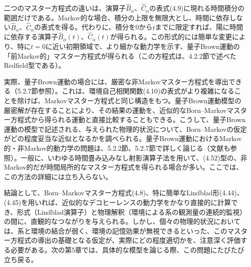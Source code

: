 \hypertarget{srcpage:170}{}\label{srcpage:170}
二つのマスター方程式の違いは、演算子$\hat B_\alpha$、$\hat C_\alpha$の表式(4.9)に現れる時間積分の範囲だけである。Markov的な場合、積分の上限を無限大とし、時間に依存しない$\hat B_\alpha$、$\hat C_\alpha$の表式を得る。代わりに、積分を0から$t$までに限定すれば、陽に時間に依存する演算子$\hat B_\alpha(t)$、$\hat C_\alpha(t)$が得られる。この形式的には簡単な変更により、特に$t=0$に近い初期領域で、より細かな動力学を示す、量子Brown運動の「前Markov的」マスター方程式が得られる（この方程式は、4.2.2節で述べたRedfield型である）。

実際、量子Brown運動の場合には、厳密な非Markovマスター方程式を導出できる（5.2.7節参照）。これは、環境自己相関関数(4.10)の表式がより複雑になることを除けば、Markovマスター方程式と同じ構造をもつ。量子Brown運動模型の厳密解が存在することにより、その結果の運動を、近似的なBorn--Markovマスター方程式から得られる運動と直接比較することもできる。こうして、量子Brown運動の模型で記述される、与えられた物理的状況について、Born--Markovの仮定がどの程度妥当な近似となるかを調べられる。量子Brown運動におけるMarkov的・非Markov的動力学の問題は、5.2.2節、5.2.7節で詳しく論じる（文献\cite{ref183}も参照）。一般に、いわゆる時間畳み込みなし射影演算子法\cite{ref204,ref205,ref206,ref207}を用いて、(4.52)型の、非Markov的だが時間局所的なマスター方程式を得られる場合が多い。ここでは、この方法の詳細には立ち入らない。

結論として、Born--Markovマスター方程式(4.8)、特に簡単なLindblad形(4.44)、(4.45)を用いれば、近似的なデコヒーレンスの動力学をかなり直接的に計算でき、形式（Lindblad演算子）と物理解釈（環境による系の観測量の連続的監視）の間に、直観的なつながりを与えられる。しかし、個々の物理的状況においては、系と環境の結合が弱く、環境の記憶効果が無視できるといった、このマスター方程式の導出の基礎となる仮定が、実際にどの程度適切かを、注意深く評価する必要がある。次の第5章では、具体的な模型を論じる際、この問題にたびたび立ち戻る。
